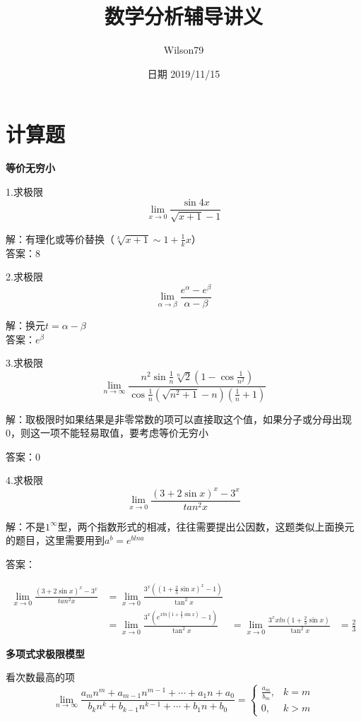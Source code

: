 \documentclass[12pt, a4paper]{ctexart}
\title{数学分析辅导讲义}
\date{日期 2019/11/15}
\author{Wilson79}
\begin{document}
\maketitle{}

\section{计算题}

    \begin{flushleft} %
    {\bfseries 等价无穷小}

    1.求极限$$\lim \limits _{x \rightarrow 0} \frac {\sin{4x}}{\sqrt{x+1}-1}$$

    解：有理化或等价替换（$\sqrt[k]{x+1}\sim 1+\frac{1}{k}x$）\\
    答案：8
    
    2.求极限$$\lim \limits _{\alpha \rightarrow \beta} \frac{e^\alpha - e^\beta}{\alpha - \beta}$$
    
    解：换元$t = \alpha - \beta$
    \\答案：$e^{\beta}$

    3.求极限\[\lim \limits _{n \rightarrow \infty}\frac{{n^2\sin {\frac{1}{n}} \sqrt[n]{2}}(1-\cos \frac{1}{n^2})} {\cos \frac{1}{n}(\sqrt{n^2+1}-n)(\frac{1}{n}+1)}\]

    解：取极限时如果结果是非零常数的项可以直接取这个值，如果分子或分母出现0，则这一项不能轻易取值，要考虑等价无穷小

    答案：0

    4.求极限\[\lim \limits _{x \rightarrow 0} \frac{(3+2 \sin x)^x - 3^x}{tan ^2x}
    \]

    解：不是$1^\infty$型，两个指数形式的相减，往往需要提出公因数，这题类似上面换元的题目，这里需要用到$a^b=e^{blna}$

    答案：

    \[
    \begin{aligned}
    \lim \limits _{x \rightarrow 0} \frac{(3+2 \sin x)^x - 3^x}{tan ^2x} &= \lim \limits _{x \rightarrow 0} {\frac{3^x\left((1+\frac{2}{3}\sin x)^x-1\right)} {\tan^2 x}} \\
    &=\lim \limits _{x \rightarrow 0} \frac{3^x(e^{xln(1+\frac{2}{3}\sin x) }-1)}{\tan^2x} 
    &=\lim \limits _{x \rightarrow 0} \frac{3^xxln(1+\frac{2}{3} \sin x)}{\tan^2 x}
    & = \frac{2}{3}
    \end{aligned}
    \]

    {\bfseries 多项式求极限模型}
    
    看次数最高的项
    \[
    \lim _{n \rightarrow \infty} \frac{a_{m} n^{m}+a_{m-1} n^{m-1}+\cdots+a_{1} n+a_{0}}{b_{k} n^{k}+b_{k-1} n^{k-1}+\cdots+b_{1} n+b_{0}}=\left\{\begin{array}{ll}{\frac{a_{m}}{b_{m}},} & {k=m} \\ {0,} & {k>m}\end{array}\right.
    \] %


\end{flushleft}
\end{document}
